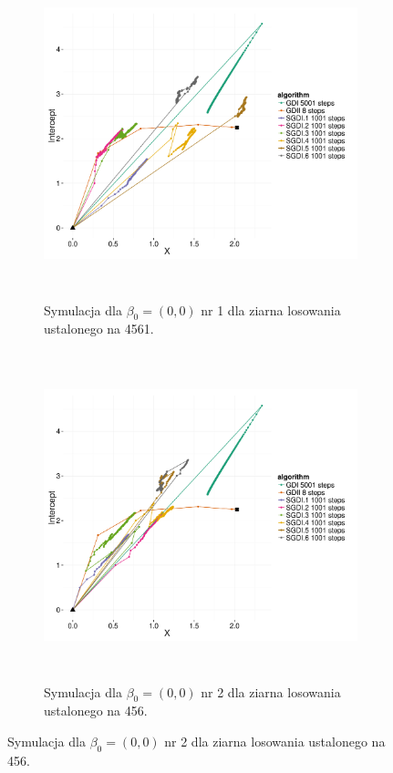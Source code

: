 \begin{figure}[hbt!]
  \begin{center}
   \begin{subfigure}[h!]{0.9\textwidth}
      \includegraphics[width=\textwidth, height=270pt]{Obrazki/sgd_00_1.pdf}
      \caption{Symulacja dla $\beta_0 = (0,0)$ nr 1 dla ziarna losowania ustalonego na 4561.}
   \end{subfigure}     
   \begin{subfigure}[h!]{0.9\textwidth}
      \includegraphics[width=\textwidth, height=270pt]{Obrazki/sgd_00_2.pdf}
      \caption{Symulacja dla $\beta_0 = (0,0)$ nr 2 dla ziarna losowania ustalonego na 456.}
   \end{subfigure}  \end{center}

\end{figure}
